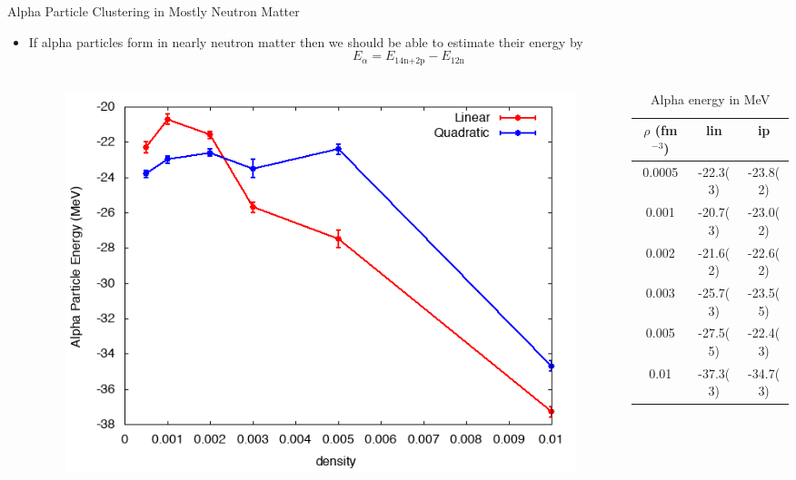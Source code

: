 \documentclass{beamer}
\begin{document}
\begin{frame}{Alpha Particle Clustering in Mostly Neutron Matter}
\begin{itemize}
   \item If alpha particles form in nearly neutron matter then we should be able to estimate their energy by
   \begin{equation*}
      E_\alpha = E_\text{14n+2p} - E_\text{12n}
   \end{equation*}
   \begin{columns}
   \begin{column}{0.5\textwidth}
   \begin{figure}[h]
      \centering
      \includegraphics[width=\textwidth]{clusterplot.png}
   \end{figure}
   \end{column}
   \begin{column}{0.5\textwidth}
   \begin{table}[h!]
      \centering
      \caption{Alpha energy in MeV}
      \begin{tabular}{ccc}
         \hline \hline
         $\rho$ (fm$^{-3}$) & lin & ip \\
         \hline
         0.0005& -22.3(3)  & -23.8(2)  \\
         0.001 & -20.7(3)  & -23.0(2)  \\
         0.002 & -21.6(2)  & -22.6(2)  \\
         0.003 & -25.7(3)  & -23.5(5)  \\
         0.005 & -27.5(5)  & -22.4(3)  \\
         0.01  & -37.3(3)  & -34.7(3)  \\
         \hline \hline
      \end{tabular}
   \end{table}
   \end{column}
   \end{columns}
\end{itemize}
\end{frame}
\end{document}
